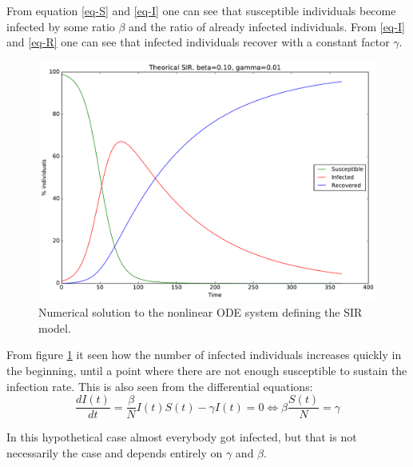 From equation \eqref{eq-S} and \eqref{eq-I} one can see that susceptible individuals become infected by some ratio $\beta$ and the ratio of already infected individuals. From \eqref{eq-I} and \eqref{eq-R} one can see that infected individuals recover with a constant factor $\gamma$. 

\begin{figure}[H]
	\centering
	\includegraphics[width= 1.0 \linewidth]{plots/sir_one_region.pdf}
	\caption{Numerical solution to the nonlinear ODE system defining the SIR model.}
	\label{fig:sir_one_region}
\end{figure}

From figure \ref{fig:sir_one_region} it seen how the number of infected individuals increases quickly in the beginning, until a point where there are not enough susceptible to sustain the infection rate. This is also seen from the differential equations:
\begin{equation}
\frac{d I(t)}{dt} = \frac{\beta}{N} I(t) S(t) - \gamma I(t) = 0 \Leftrightarrow \beta\frac{S(t)}{N} = \gamma
\end{equation}

In this hypothetical case almost everybody got infected, but that is not necessarily the case and depends entirely on $\gamma$ and $\beta$.

